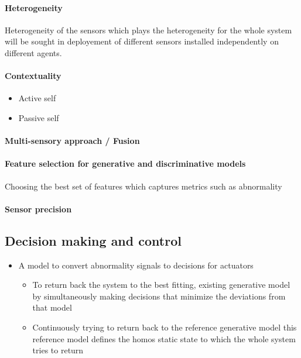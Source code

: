 \documentclass{article}
\begin{document}
			\paragraph{Heterogeneity}
				Heterogeneity of the sensors which plays the heterogeneity for the whole system  will be sought in deployement of different sensors installed independently on different agents.  
				
			\paragraph{Contextuality}
				\begin{itemize}
					\item Active self
					\item Passive self
				\end{itemize}
			
			\paragraph{Multi-sensory approach / Fusion}
			
			\paragraph{Feature selection for generative and discriminative models}
			Choosing the best set of features which captures metrics such as abnormality
			
			\paragraph{Sensor precision} 
			
		\subsection{Decision making and control}
			\begin{itemize}
				\item A model to convert abnormality signals to decisions for actuators
				\begin{itemize}
					\item To return back the system to the best fitting, existing generative model by simultaneously making decisions that minimize the deviations from that model
					\item Continuously trying to return back to the reference generative model this reference model defines the homos static state to which the whole system tries to return 
				\end{itemize}
			\end{itemize}
		
\end{document}
